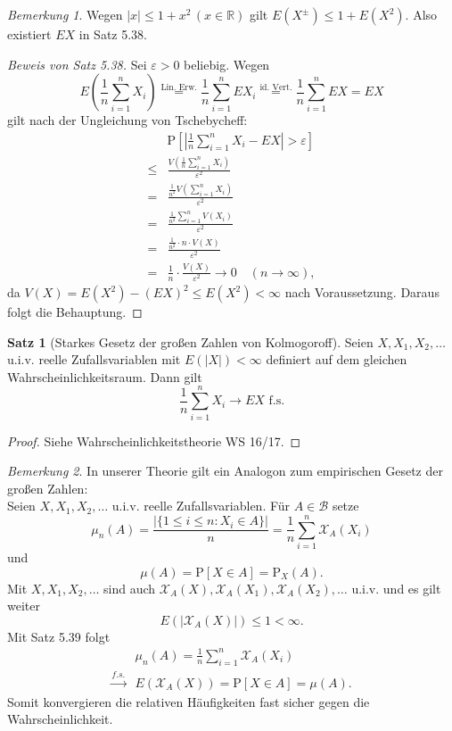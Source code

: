 \documentclass[a4paper,12pt,fleqn]{scrartcl}
\newcommand{\R}{\mathbb{R}}
\newcommand{\m}[1]{\mathcal{ #1 }}
\newcommand{\WR}{Wahrscheinlichkeitsraum}
\newcommand{\ZV}{Zufallsvariable}
\theoremstyle{definition}
\newtheorem{satz}[definition]{Satz}
\theoremstyle{plain}
\theoremstyle{remark}
\newtheorem*{bemerkung}{Bemerkung}
\begin{document}
\begin{bemerkung}
Wegen $|x| \leq 1 + x^2 \, (x \in \R)$ gilt $E(X^\pm) \leq1 + E(X^2)$. Also existiert $EX$ in Satz 5.38.
\end{bemerkung}
\begin{proof}[Beweis von Satz 5.38]
Sei $\varepsilon > 0$ beliebig. Wegen
\[E(\frac{1}{n} \sum_{i=1}^{n} X_i) \overset{\text{Lin. Erw.}}{=} \frac{1}{n} \sum_{i=1}^{n} EX_i \overset{\text{id. Vert.}}{=} \frac{1}{n} \sum_{i=1}^{n} EX = EX\]
gilt nach der Ungleichung von Tschebycheff:
\begin{align*}
&\text{P}[|\frac{1}{n} \sum_{i=1}^{n} X_i - EX| > \varepsilon] \\
\leq&\frac{V(\frac{1}{n} \sum_{i=1}^{n} X_i)}{\varepsilon^2} \\
=&\frac{\frac{1}{n^2} V(\sum_{i=1}^{n} X_i)}{\varepsilon^2}  \\
=&\frac{\frac{1}{n^2} \sum_{i=1}^{n} V(X_i)}{\varepsilon^2} \tag{$X_i$ unabhängig} \\
=&\frac{\frac{1}{n^2} \cdot n \cdot V(X)}{\varepsilon^2} \tag{id. Vert.} \\
=&\frac{1}{n} \cdot \frac{V(X)}{\varepsilon^2} \rightarrow 0 \quad (n \rightarrow \infty),
\end{align*}
da $V(X) = E(X^2) - (EX)^2 \leq E(X^2) < \infty$ nach Voraussetzung. Daraus folgt die Behauptung.
\end{proof}
\begin{satz}[Starkes Gesetz der großen Zahlen von Kolmogoroff]
Seien $X, X_1, X_2, \ldots$ u.i.v. reelle \ZV n mit $E(|X|) < \infty$ definiert auf dem gleichen \WR . Dann gilt
\[\frac{1}{n} \sum_{i=1}^n X_i \rightarrow EX \text{ f.s.}\]
\end{satz}
\begin{proof}
Siehe Wahrscheinlichkeitstheorie WS 16/17.
\end{proof}
\begin{bemerkung}
In unserer Theorie gilt ein Analogon zum empirischen Gesetz der großen Zahlen: \\
Seien $X, X_1, X_2,\ldots$ u.i.v. reelle \ZV n. Für $A \in \m{B}$ setze
\[\mu_n(A) = \frac{|\{1 \leq i \leq n : X_i \in A\}|}{n} = \frac{1}{n} \sum_{i=1}^n \m{X}_A(X_i)\]
und 
\[\mu(A) = \text{P}[X \in A] = \text{P}_X(A).\]
Mit $X, X_1, X_2, \ldots$ sind auch $\m{X}_A(X), \m{X}_A(X_1), \m{X}_A(X_2), \ldots$ u.i.v. und es gilt weiter
\[E(|\m{X}_A(X)|) \leq 1 < \infty.\]
Mit Satz 5.39 folgt
\begin{align*}
&\mu_n(A) = \frac{1}{n} \sum_{i=1}^n \m{X}_A(X_i) \\
\stackrel{f.s.}{\rightarrow} & E(\m{X}_A(X)) = \text{P}[X \in A] = \mu(A).
\end{align*}
Somit konvergieren die relativen Häufigkeiten fast sicher gegen die Wahrscheinlichkeit.
\end{bemerkung}
\end{document}
